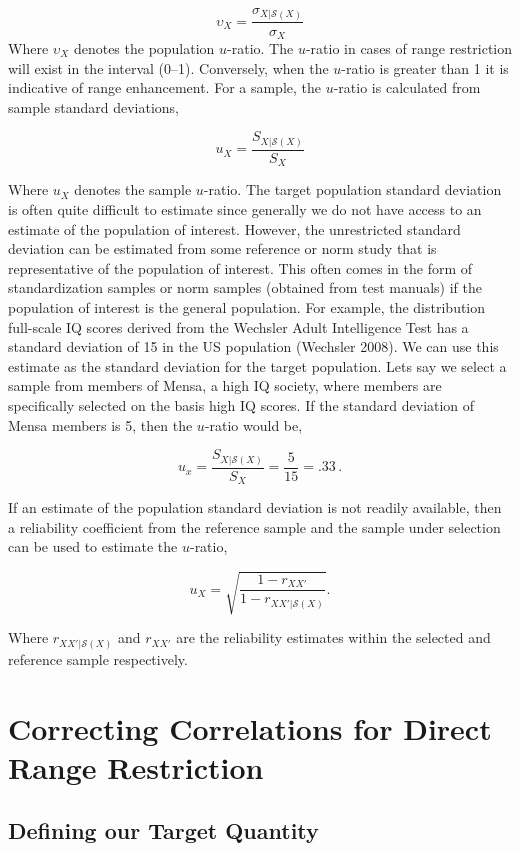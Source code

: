 \documentclass[
  letterpaper,
  DIV=11,
  numbers=noendperiod]{scrreprt}
\begin{document}
\[
\upsilon_X = \frac{\sigma_{X|\mathcal{S}(X)}}{\sigma_{X}}
\] Where \(\upsilon_{X}\) denotes the population \(u\)-ratio. The
\(u\)-ratio in cases of range restriction will exist in the interval
(0--1). Conversely, when the \(u\)-ratio is greater than 1 it is
indicative of range enhancement. For a sample, the \(u\)-ratio is
calculated from sample standard deviations,

\[
u_X = \frac{S_{X|\mathcal{S}(X)}}{S_X}
\]

Where \(u_{X}\) denotes the sample \(u\)-ratio. The target population
standard deviation is often quite difficult to estimate since generally
we do not have access to an estimate of the population of interest.
However, the unrestricted standard deviation can be estimated from some
reference or norm study that is representative of the population of
interest. This often comes in the form of standardization samples or
norm samples (obtained from test manuals) if the population of interest
is the general population. For example, the distribution full-scale IQ
scores derived from the Wechsler Adult Intelligence Test has a standard
deviation of 15 in the US population (Wechsler 2008). We can use this
estimate as the standard deviation for the target population. Lets say
we select a sample from members of Mensa, a high IQ society, where
members are specifically selected on the basis high IQ scores. If the
standard deviation of Mensa members is 5, then the \(u\)-ratio would be,

\[
u_x = \frac{S_{X|\mathcal{S}(X)}}{S_X} = \frac{5}{15}= .33\, .
\]

If an estimate of the population standard deviation is not readily
available, then a reliability coefficient from the reference sample and
the sample under selection can be used to estimate the \(u\)-ratio,

\[
u_X = \sqrt{\frac{1-r_{XX'}}{1-r_{XX'|\mathcal{S}(X)}}}.
\]

Where \(r_{XX'|\mathcal{S}(X)}\) and \(r_{XX'}\) are the reliability
estimates within the selected and reference sample respectively.

\hypertarget{correcting-correlations-for-direct-range-restriction}{%
\section{Correcting Correlations for Direct Range
Restriction}\label{correcting-correlations-for-direct-range-restriction}}

\hypertarget{defining-our-target-quantity-4}{%
\subsection{Defining our Target
Quantity}\label{defining-our-target-quantity-4}}
\end{document}
